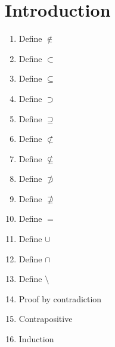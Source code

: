 \documentclass[../../main.tex]{subfiles}
\begin{document}
\section*{Introduction}
\begin{enumerate}
    \item Define $\notin$
    \item Define $\subset$
    \item Define $\subseteq$
    \item Define $\supset$
    \item Define $\supseteq$
    \item Define $\not\subset$
    \item Define $\not\subseteq$
    \item Define $\not\supset$
    \item Define $\not\supseteq$
    \item Define $=$
    \item Define $\cup$
    \item Define $\cap$
    \item Define $\setminus$
    \item Proof by contradiction
    \item Contrapositive
    \item Induction
\end{enumerate}
\end{document}
